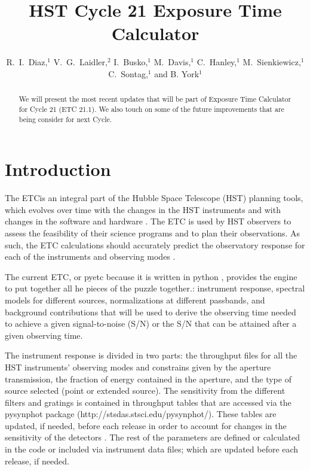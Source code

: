 
\resetcounters




\title{HST Cycle 21 Exposure Time Calculator}
\author{R.~I.~Diaz,$^1$ V.~G.~Laidler,$^2$ I.~Busko,$^1$ M.~Davis,$^1$ C.~Hanley,$^1$ M.~Sienkiewicz,$^1$ C.~Sontag,$^1$ and B. York$^1$
}


\begin{abstract}
We will present the most recent updates that will be part of Exposure Time Calculator for 
Cycle 21 (ETC 21.1). We also touch on 
some of the future improvements that are being consider for next Cycle. 
\end{abstract}

\section{Introduction}
The ETCis an integral part of the  Hubble Space Telescope (HST) planning tools, which
evolves over time with the changes in the HST
instruments and with changes in the software and hardware \citep{Diaz3_2010, Diazetal_2010}.
The ETC is used by HST observers
to assess the feasibility of their science programs and to plan their observations.
As such, the ETC calculations should accurately predict the observatory response
for each of the instruments and observing modes \citep{Diaz_2012}.

The current ETC, or pyetc because it is written in python \citep{pyetc2010}, provides the engine to
put together all he pieces of the puzzle together.: instrument response, spectral models for different
sources, normalizations at different passbands, and background contributions that will be used to derive
the observing time needed to achieve a given signal-to-noise (S/N) or the S/N that can be attained after
a given observing time.

The instrument response is divided in two parts: the throughput files for all the HST instruments'
observing modes  and constrains given by  the aperture
transmission, the  fraction of energy contained in the aperture, and the type of source selected (point or extended source).
The sensitivity from the different filters and gratings is contained in throughput tables
that are accessed via the pysynphot package (http://stsdas.stsci.edu/pysynphot/). These tables are updated, if needed,
before each release in order to account for changes in the sensitivity of the detectors \citep{cdbs_2012}.
The rest of the parameters are defined or calculated in the code or included via instrument data files;
which are updated before each release, if needed.

